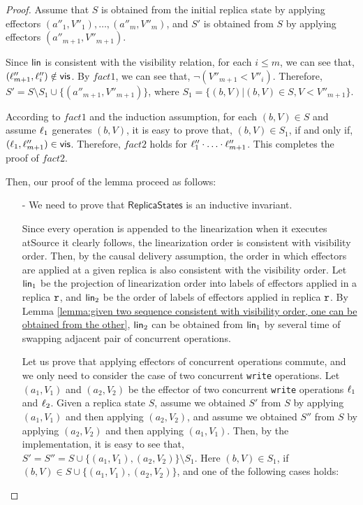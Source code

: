 \begin {proof}
Assume that $S$ is obtained from the initial replica state by applying effectors $(a''_1,V''_1),\ldots,(a''_m,V''_m)$, and $S'$ is obtained from $S$ by applying effectors $(a''_{m+1}, V''_{m+1})$.

Since $\mathsf{lin}$ is consistent with the visibility relation, for each $i \leq m$, we can see that, $(\ell''_{m+1},\ell''_i) \notin \mathsf{vis}$. By $fact1$, we can see that, $\neg (V''_{m+1} < V''_i)$. Therefore, $S' = S \setminus S_1 \cup \{ (a''_{m+1},V''_{m+1}) \}$, where $S_1 = \{ (b,V) \vert (b,V) \in S, V < V''_{m+1} \}$.

According to $fact1$ and the induction assumption, for each $(b,V) \in S$ and assume $\ell_1$ generates $(b,V)$, it is easy to prove that, $(b,V) \in S_1$, if and only if, $(\ell_1,\ell''_{m+1}) \in \mathsf{vis}$. Therefore, $fact2$ holds for $\ell''_1 \cdot \ldots \cdot \ell''_{m+1}$. This completes the proof of $fact2$.


Then, our proof of the lemma proceed as follows:

\begin{itemize}
\setlength{\itemsep}{0.5pt}
\item[-] We need to prove that $\mathsf{ReplicaStates}$ is an inductive invariant.

Since every operation is appended to the linearization when it executes atSource it clearly follows, the linearization order is consistent with visibility order. Then, by the causal delivery assumption, the order in which effectors are applied at a given replica is also consistent with the visibility order. Let $\mathsf{lin}_1$ be the projection of linearization order into labels of effectors applied in a replica $\mathtt{r}$, and $\mathsf{lin}_2$ be the order of labels of effectors applied in replica $\mathtt{r}$. By Lemma \ref{lemma:given two sequence consistent with visibility order, one can be obtained from the other}, $\mathsf{lin}_2$ can be obtained from $\mathsf{lin}_1$ by several time of swapping adjacent pair of concurrent operations.

Let us prove that applying effectors of concurrent operations commute, and we only need to consider the case of two concurrent {\tt write} operations. Let $(a_1,V_1)$ and $(a_2,V_2)$ be the effector of two concurrent {\tt write} operations $\ell_1$ and $\ell_2$. Given a replica state $S$, assume we obtained $S'$ from $S$ by applying $(a_1,V_1)$ and then applying $(a_2,V_2)$, and assume we obtained $S''$ from $S$ by applying $(a_2,V_2)$ and then applying $(a_1,V_1)$. Then, by the implementation, it is easy to see that, $S' = S'' = S \cup \{ (a_1,V_1),(a_2,V_2) \} \setminus S_1$. Here $(b,V) \in S_1$, if $(b,V) \in S \cup \{ (a_1,V_1),(a_2,V_2) \}$, and one of the following cases holds:


\end{itemize}
\end{proof}
